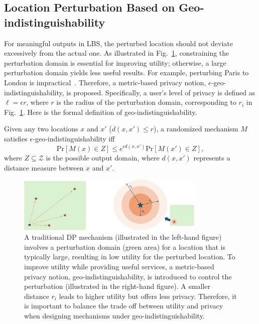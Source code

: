 \subsection{Location Perturbation Based on Geo-indistinguishability}
For meaningful outputs in LBS, the perturbed location should not deviate excessively from the actual one.   As illustrated in Fig.~\ref{geo}, constraining the perturbation domain is essential for improving utility; otherwise, a large perturbation domain yields less useful results. For example, perturbing Paris to London is impractical~\cite{andres2013geo}. Therefore, a metric-based privacy notion, $\epsilon$-geo-indistinguishability, is proposed.  Specifically, a user's level of privacy is defined as $\ell=\epsilon r$, where $r$ is the radius of the perturbation domain, corresponding to $r_i$ in Fig.~\ref{geo}. Here is the formal definition of geo-indistinguishability.
\begin{definition}
	Given any two locations $x$ and $x'$ ($d(x, x')\le r$), a randomized mechanism $M$ satisfies  $\epsilon$-geo-indistinguishability iff
	\begin{equation}\nonumber
		\mathrm{Pr}[M(x)\in Z]\le e^{\epsilon d(x, x')}\mathrm{Pr}[M(x')\in Z],
	\end{equation}
	where $Z\subseteq \mathcal{Z}$ is the possible output domain, where $d(x, x')$ represents a distance measure between $x$ and $x'$.
\end{definition}

\begin{figure}[h]
	\centering
	\includegraphics[width=0.8\textwidth]{submissions/submission4/figs/05-release/geo-crop.pdf}
	\caption{A traditional DP mechanism (illustrated in the left-hand figure) involves a perturbation domain (green area) for a location that is typically large, resulting in low utility for the perturbed location. To improve utility while providing useful services, a metric-based privacy notion, geo-indistinguishability, is introduced to control the perturbation (illustrated in the right-hand figure). A smaller distance $r_i$ leads to higher utility but offers less privacy. Therefore, it is important to balance the trade off between utility and privacy when designing mechanisms under geo-indistinguishability.}
	\label{geo}
\end{figure}


